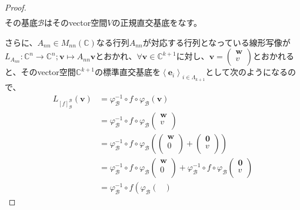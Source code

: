 \documentclass[dvipdfmx]{jsarticle}
\begin{document}
\begin{proof}
\begin{align*}
\end{align*}
その基底$\mathcal{B}$はそのvector空間$V$の正規直交基底をなす。\par
さらに、$A_{nn} \in M_{nn}\left( \mathbb{C} \right)$なる行列$A_{nn}$が対応する行列となっている線形写像が$L_{A_{nn}}:\mathbb{C}^{n} \rightarrow \mathbb{C}^{n};\mathbf{v} \mapsto A_{nn}\mathbf{v}$とおかれ、$\forall\mathbf{v} \in \mathbb{C}^{k + 1}$に対し、$\mathbf{v} = \begin{pmatrix}
\mathbf{w} \\
v \\
\end{pmatrix}$とおかれると、そのvector空間$\mathbb{C}^{k + 1}$の標準直交基底を$\left\langle \mathbf{e}_{i} \right\rangle_{i \in \varLambda_{k + 1}}$として次のようになるので、
\begin{align*}
L_{[ f]_{\mathcal{B}}^{\mathcal{B}}}\left( \mathbf{v} \right) &= \varphi_{\mathcal{B}}^{- 1} \circ f \circ \varphi_{\mathcal{B}}\left( \mathbf{v} \right)\\
&= \varphi_{\mathcal{B}}^{- 1} \circ f \circ \varphi_{\mathcal{B}}\begin{pmatrix}
\mathbf{w} \\
v \\
\end{pmatrix}\\
&= \varphi_{\mathcal{B}}^{- 1} \circ f \circ \varphi_{\mathcal{B}}\left( \begin{pmatrix}
\mathbf{w} \\
0 \\
\end{pmatrix} + \begin{pmatrix}
\mathbf{0} \\
v \\
\end{pmatrix} \right)\\
&= \varphi_{\mathcal{B}}^{- 1} \circ f \circ \varphi_{\mathcal{B}}\begin{pmatrix}
\mathbf{w} \\
0 \\
\end{pmatrix} + \varphi_{\mathcal{B}}^{- 1} \circ f \circ \varphi_{\mathcal{B}}\begin{pmatrix}
\mathbf{0} \\
v \\
\end{pmatrix}\\
&= \varphi_{\mathcal{B}}^{- 1} \circ f\left( \varphi_{\mathcal{B}}\begin{pmatrix}

\end{pmatrix}
\end{align*}
\end{proof}
\end{document}
